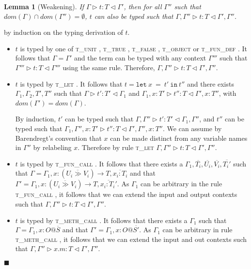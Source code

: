 \documentclass[preprint]{sigplanconf}
\newtheorem{lem}{Lemma}
\newcommand{\tunit}{\textsc{t\_unit} }
\newcommand{\ttrue}{\textsc{t\_true} }
\newcommand{\tfalse}{\textsc{t\_false} }
\newcommand{\tobj}{\textsc{t\_object} }
\newcommand{\tfundef}{\textsc{t\_fun\_def} }
\newcommand{\tlet}{\textsc{t\_let} }
\newcommand{\tfunc}{\textsc{t\_fun\_call} }
\newcommand{\tmethc}{\textsc{t\_meth\_call} }
\newcommand{\typerule}[4]{#1 \triangleright #2 : #3 \triangleleft #4}
\newcommand{\lett}[3]{\mathtt{let}\:#1\:\mathtt{=}\:#2\:\mathtt{in}\:#3}
\newcommand{\qed}{$\blacksquare$}
\newenvironment{proof}{\vspace{1ex}\noindent{\bf Proof}\hspace{0.5em}}
  {\hfill\qed\vspace{1ex}}
\begin{document}
\begin{lem}[Weakening]
\label{lem:weakening}
If $\typerule{\Gamma}{t}{T}{\Gamma'}$,
then for all $\Gamma''$ such that $dom(\Gamma) \cap dom(\Gamma'') = \emptyset$,
$t$ can also be typed such that
$\typerule{\Gamma, \Gamma''}{t}{T}{\Gamma', \Gamma''}$.
\end{lem}
\begin{proof}
by induction on the typing derivation of $t$.

\begin{itemize}
\item $t$ is typed by one of \tunit, \ttrue, \tfalse, \tobj or \tfundef.
It follows that $\Gamma = \Gamma'$ and the term can be typed with any
context $\Gamma'''$ such that $\typerule{\Gamma'''}{t}{T}{\Gamma'''}$
using the same rule. 
Therefore, $\typerule{\Gamma, \Gamma''}{t}{T}{\Gamma', \Gamma''}$.

\item $t$ is typed by \tlet. It follows that $t = \lett{x}{t'}{t''}$ and
there exists $\Gamma_1, \Gamma_2, T', T''$ such that
$\typerule{\Gamma}{t'}{T'}{\Gamma_1}$ and
$\typerule{\Gamma_1, x : T'}{t''}{T}{\Gamma', x : T''}$,
with $dom(\Gamma') = dom(\Gamma)$.

By induction, $t'$ can be typed such
that $\typerule{\Gamma,\Gamma''}{t'}{T'}{\Gamma_1,\Gamma''}$,
and $t''$ can be typed such that
$\typerule{\Gamma_1, \Gamma'', x : T'}{t''}{T}{\Gamma', \Gamma'', x : T''}$.
We can assume by Barendregt's convention that $x$ can be made distinct from
any variable names in $\Gamma''$ by relabeling $x$.
Therefore by rule \tlet
$\typerule{\Gamma, \Gamma''}{t}{T}{\Gamma', \Gamma''}$.

\item $t$ is typed by \tfunc. It follows that
there exists a $\Gamma_1, \overline{T_i}, \overline{U_i}, \overline{V_i}, \overline{T_i'}$ 
such that 
$\Gamma = \Gamma_1, x : (\overline{U_i \gg V_i}) \rightarrow T, \overline{x_i : T_i}$
and that
$\Gamma' = \Gamma_1, x : (\overline{U_i \gg V_i}) \rightarrow T, \overline{x_i : T_i'}$.
As $\Gamma_1$ can be arbitrary in the rule \tfunc, it follows that we
can extend the input and output contexts such that
$\typerule{\Gamma, \Gamma''}{t}{T}{\Gamma', \Gamma''}$.

\item $t$ is typed by \tmethc. It follows that there exists
a $\Gamma_1$ such that $\Gamma = \Gamma_1, x : O@\overline{S}$ and that 
$\Gamma' = \Gamma_1, x : O@\overline{S'}$.
As $\Gamma_1$ can be arbitrary in rule \tmethc, it follows that we can
extend the input and out contexts such that
$\typerule{\Gamma, \Gamma''}{x.m}{T}{\Gamma', \Gamma''}$.


\end{itemize}
\end{proof}
\end{document}
